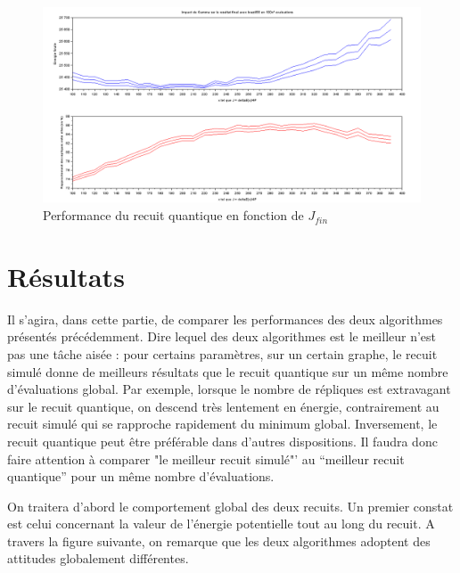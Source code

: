 \documentclass{article}%
\begin{document}
	\begin{figure}[!h]
	\begin{center}
	\includegraphics[scale=0.25]{gamma.png}
	\caption{Performance du recuit quantique en fonction de $ J_{fin} $}
	\label{gamma}
	\end{center}
	\end{figure}


\clearpage
\section{Résultats}

\vspace{1cm}

		Il s'agira, dans cette partie, de comparer les performances des deux algorithmes présentés précédemment. Dire lequel des deux algorithmes est le meilleur n'est pas une tâche aisée : pour certains paramètres, sur un certain graphe, le recuit simulé donne de meilleurs résultats que le recuit quantique sur un même nombre d'évaluations global. Par exemple, lorsque le nombre de répliques est extravagant sur le recuit quantique, on descend très lentement en énergie, contrairement au recuit simulé qui se rapproche rapidement du minimum global. Inversement, le recuit quantique peut être préférable dans d'autres dispositions. Il faudra donc faire attention à comparer "le meilleur recuit simulé"' au "`meilleur recuit quantique"' pour un même nombre d'évaluations.
		
\vspace{1cm}

		On traitera d'abord le comportement global des deux recuits. Un premier constat est celui concernant la valeur de l'énergie potentielle tout au long du recuit. A travers la figure suivante, on remarque que les deux algorithmes adoptent des attitudes globalement différentes.
		
\end{document}
